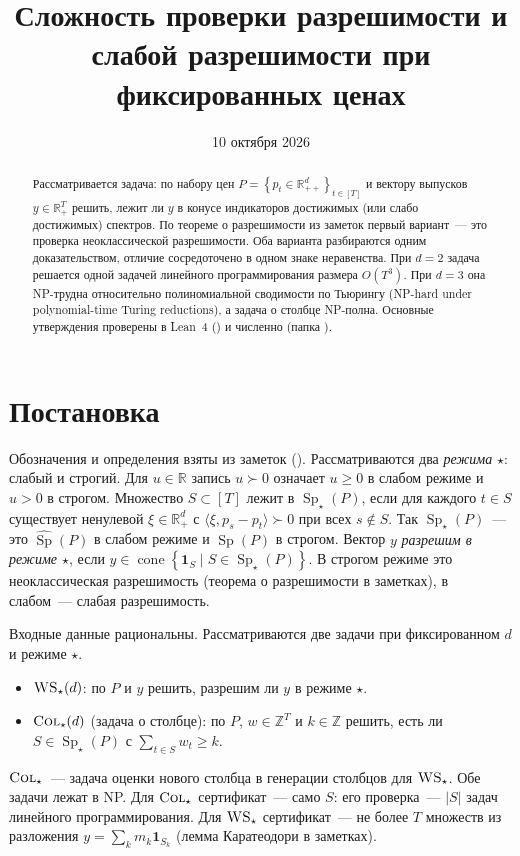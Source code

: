 \documentclass[a4paper,11pt]{article}
\title{Сложность проверки разрешимости и слабой разрешимости при фиксированных ценах}
\author{}
\date{10 октября 2026}
\theoremstyle{plain}
\theoremstyle{definition}
\theoremstyle{remark}
\newcommand{\R}{\mathbb{R}}
\newcommand{\Z}{\mathbb{Z}}
\newcommand{\abs}[1]{\left\lvert #1 \right\rvert}
\newcommand{\set}[1]{\left\{ #1 \right\}}
\newcommand{\ip}[2]{\langle #1, #2\rangle}
\newcommand{\Rpp}[1][2]{\R^{#1}_{++}}
\newcommand{\Rp}[1][2]{\R^{#1}_{+}}
\DeclareMathOperator{\cone}{cone}
\DeclareMathOperator{\Sp}{Sp}
\newcommand{\WS}{\textsc{WS}}
\newcommand{\COL}{\textsc{Col}}
\newcommand{\Spm}{\Sp_\star}
\newcommand{\gs}{\mathrel{\succ}}
\begin{document}
\maketitle

\begin{abstract}
Рассматривается задача: по набору цен $P=\set{p_t\in\Rpp[d]}_{t\in[T]}$ и вектору выпусков $y\in\Rp[T]$ решить, лежит ли $y$ в конусе индикаторов достижимых (или слабо достижимых) спектров. По теореме о разрешимости из заметок первый вариант~--- это проверка неоклассической разрешимости. Оба варианта разбираются одним доказательством, отличие сосредоточено в одном знаке неравенства. При $d=2$ задача решается одной задачей линейного программирования размера $O(T^3)$. При $d=3$ она NP-трудна относительно полиномиальной сводимости по Тьюрингу (NP-hard under polynomial-time Turing reductions), а задача о столбце NP-полна. Основные утверждения проверены в Lean~4 () и численно (папка ).
\end{abstract}

\section{Постановка}

Обозначения и определения взяты из заметок (). Рассматриваются два \emph{режима} $\star$: слабый и строгий. Для $u\in\R$ запись $u\gs0$ означает $u\ge0$ в слабом режиме и $u>0$ в строгом. Множество $S\subset[T]$ лежит в $\Spm(P)$, если для каждого $t\in S$ существует ненулевой $\xi\in\Rp[d]$ с $\ip{\xi}{p_s-p_t}\gs0$ при всех $s\notin S$. Так $\Spm(P)$~--- это $\widehat{\Sp}(P)$ в слабом режиме и $\Sp(P)$ в строгом. Вектор $y$ \emph{разрешим в режиме $\star$}, если $y\in\cone\set{\mathbf 1_S\mid S\in\Spm(P)}$. В строгом режиме это неоклассическая разрешимость (теорема о разрешимости в заметках), в слабом~--- слабая разрешимость.

Входные данные рациональны. Рассматриваются две задачи при фиксированном $d$ и режиме $\star$.
\begin{itemize}
    \item $\WS_\star(d)$: по $P$ и $y$ решить, разрешим ли $y$ в режиме $\star$.
    \item $\COL_\star(d)$ (задача о столбце): по $P$, $w\in\Z^T$ и $k\in\Z$ решить, есть ли $S\in\Spm(P)$ с $\sum_{t\in S}w_t\ge k$.
\end{itemize}
$\COL_\star$~--- задача оценки нового столбца в генерации столбцов для $\WS_\star$. Обе задачи лежат в NP. Для $\COL_\star$ сертификат~--- само $S$: его проверка~--- $\abs S$ задач линейного программирования. Для $\WS_\star$ сертификат~--- не более $T$ множеств из разложения $y=\sum_km_k\mathbf 1_{S_k}$ (лемма Каратеодори в заметках).
\end{document}

